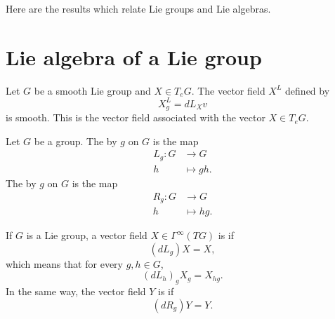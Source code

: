 
Here are the results which relate Lie groups and Lie algebras.

\section{Lie algebra of a Lie group}

\begin{lemmaDef}        \label{DEFooSSDYooOwjHso}
	Let \( G\) be a smooth Lie group and \( X\in T_eG\). The vector field \( X^L\) defined by
	\begin{equation}
		X^L_g=dL_Xv
	\end{equation}
	is smooth. This is the  vector field associated with the vector \( X\in T_eG\).
\end{lemmaDef}

\begin{definition}
	Let \( G\) be a group. The  by \( g\) on \( G\) is the map
	\begin{equation}
		\begin{aligned}
			L_g\colon G & \to G       \\
			h           & \mapsto gh.
		\end{aligned}
	\end{equation}
	The  by \( g\) on \( G\) is the map
	\begin{equation}
		\begin{aligned}
			R_g\colon G & \to G       \\
			h           & \mapsto hg.
		\end{aligned}
	\end{equation}
\end{definition}

\begin{definition}        \label{DEFooYHKXooVoJalX}
	If $G$ is a Lie group, a vector field $X\in\Gamma^{\infty}(TG)$ is  if
	\begin{equation}
		(dL_g) X= X,
	\end{equation}
	which means that for every \( g,h\in G\),
	\begin{equation}
		(dL_h)_gX_g=X_{hg}.
	\end{equation}
	In the same way, the vector field \( Y\) is  if
	\begin{equation}
		(dR_g)Y=Y.
	\end{equation}
\end{definition}

